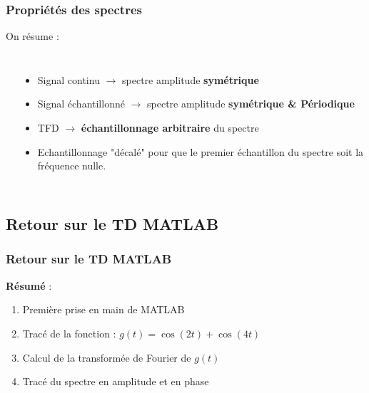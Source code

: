 \documentclass{beamer}
\begin{document}
\begin{frame}
\frametitle{Propriétés des spectres}
On résume :
\begin{columns}
\column{60mm}
\begin{center}
\end{center}
\column{60mm}
\begin{itemize}
\item Signal continu $\rightarrow$ spectre amplitude \textbf{symétrique}
\vspace{0.3cm}
\item<2-> Signal échantillonné $\rightarrow$ spectre amplitude \textbf{symétrique \& Périodique}
\vspace{0.3cm}
\item<3-> TFD $\rightarrow$ \textbf{échantillonnage arbitraire} du spectre
\vspace{0.3cm}
\item<4-> Echantillonnage "décalé" pour que le premier échantillon du spectre soit la fréquence nulle.
\end{itemize}
\end{columns}
\end{frame}

\subsection{Retour sur le TD MATLAB}
\begin{frame}
\frametitle{Retour sur le TD MATLAB}
\textbf{Résumé }: 
\vspace{0.3cm}
\begin{enumerate}
\item Première prise en main de MATLAB
\vspace{0.3cm}
\item Tracé de la fonction : $g(t) = \cos(2t) + \cos(4t)$
\vspace{0.3cm}
\item Calcul de la transformée de Fourier de $g(t)$
\vspace{0.3cm}
\item Tracé du spectre en amplitude et en phase
\end{enumerate}
\end{frame}
\end{document}
